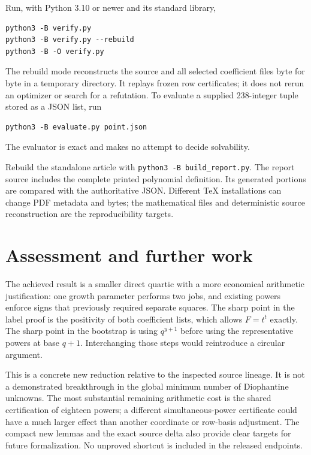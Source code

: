 \documentclass[11pt]{article}
\begin{document}
Run, with Python 3.10 or newer and its standard library,
\begin{verbatim}
python3 -B verify.py
python3 -B verify.py --rebuild
python3 -B -O verify.py
\end{verbatim}
The rebuild mode reconstructs the source and all selected coefficient files
byte for byte in a temporary directory. It replays frozen row certificates;
it does not rerun an optimizer or search for a refutation. To evaluate a
supplied 238-integer tuple stored as a JSON list, run
\begin{verbatim}
python3 -B evaluate.py point.json
\end{verbatim}
The evaluator is exact and makes no attempt to decide solvability.

Rebuild the standalone article with \texttt{python3 -B build\_report.py}.
The report source includes the complete printed polynomial definition.
Its generated portions are compared with the authoritative JSON. Different
TeX installations can change PDF metadata and bytes; the mathematical files
and deterministic source reconstruction are the reproducibility targets.

\section{Assessment and further work}

The achieved result is a smaller direct quartic with a more economical
arithmetic justification: one growth parameter performs two jobs, and
existing powers enforce signs that previously required separate squares.
The sharp point in the label proof is the positivity of both coefficient
lists, which allows $F=t^t$ exactly. The sharp point in the bootstrap is
using $q^{y+1}$ before using the representative powers at base $q+1$.
Interchanging those steps would reintroduce a circular argument.

This is a concrete new reduction relative to the inspected source lineage.
It is not a demonstrated breakthrough in the global minimum number of
Diophantine unknowns. The most substantial remaining arithmetic cost is
the shared certification of eighteen powers; a different simultaneous-power
certificate could have a much larger effect than another coordinate or
row-basis adjustment. The compact new lemmas and the exact source delta
also provide clear targets for future formalization. No unproved shortcut
is included in the released endpoints.
\end{document}
